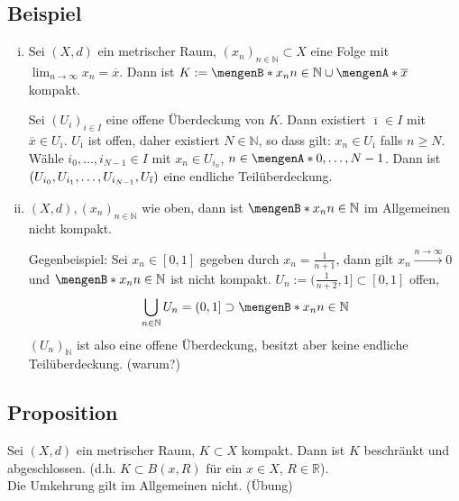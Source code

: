 \subsection[Beispiele für kompakte Mengen]{Beispiel} %
\label{sub:43}
\begin{enumerate}[(i)]
	\item Sei $(X,d)$ ein metrischer Raum, $(x_n)_{n \in \mathds{N}} \subset X$ eine Folge mit $\lim_{ n \to \infty} x_n = \overline{x}$. Dann ist 
	$K := \set[x_n]{n \in \mathds{N} } \cup \set{\overline{x}} $ kompakt.

	Sei $(U_i)_{i \in I}$ eine offene Überdeckung von $K$. Dann existiert $\overline{\imath} \in I$ mit $\overline{x} \in U_{\overline{\imath} } $. 
	$U_{\overline{\imath} }$ ist offen, daher existiert $N \in \mathds{N}$, so dass gilt: $x_n \in U_{\overline{\imath} }$ falls $n \ge N$. Wähle 
	$i_0, \ldots , i_{N-1} \in I$ mit $x_n \in U_{i_n}$,
	$n \in \set{0, \ldots , N-1} $. Dann ist $(U_{i_0}, U_{i_1}, \ldots , U_{i_{N-1}}, U_{\overline{\imath} })$ eine endliche Teilüberdeckung. \bewende
	\item $(X,d), (x_n)_{n \in \mathds{N}}$ wie oben, dann ist $\set[x_n]{n \in \mathds{N}} $ im Allgemeinen nicht kompakt.
	
	Gegenbeispiel: Sei $x_n \in [0,1]$ gegeben durch $x_n= \frac{1}{n+1} $, dann gilt $x_n \xrightarrow{n \to \infty} 0$ und $\set[x_n]{n \in \mathds{N}}$ ist nicht
	kompakt. $U_n := (\frac{1}{n+2}, 1 ] \subset [0,1]$ offen, 
	\[
		\bigcup_{n \in \mathds{N}} U_n = (0,1] \supset \set[x_n]{n \in \mathds{N}} 
	\]
	$(U_n)_\mathds{N}$ ist also eine offene Überdeckung, besitzt aber keine endliche Teilüberdeckung. \hfill (warum?)
\end{enumerate}

\subsection[Proposition über die Eigenschaften einer kompakten Teilmenge]{Proposition} %
\label{sub:44}
Sei $(X,d)$ ein metrischer Raum, $K \subset X$ kompakt. Dann ist $K$ beschränkt und abgeschlossen. (d.h. $K \subset B(x,R)$ für ein $x \in X$, $R \in \mathds{R}$). \\
Die Umkehrung gilt im Allgemeinen nicht. \hfill (Übung)

